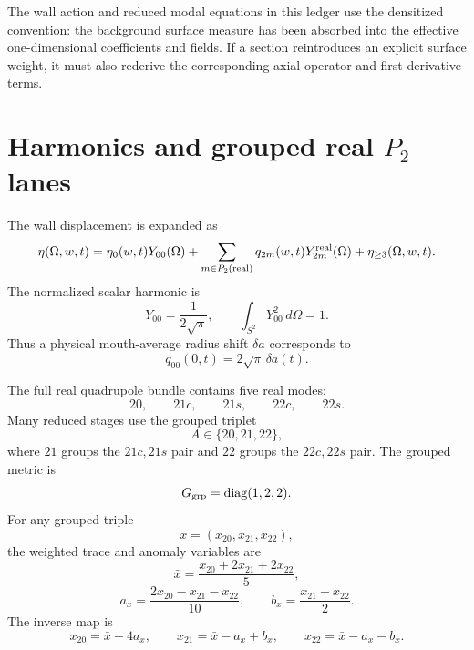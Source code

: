 The wall action and reduced modal equations in this ledger use the densitized convention: the background surface measure has been absorbed into the effective one-dimensional coefficients and fields.  If a section reintroduces an explicit surface weight, it must also rederive the corresponding axial operator and first-derivative terms.

\section{Harmonics and grouped real \texorpdfstring{\(P_2\)}{P2} lanes}
\label{sec:harmonic-p2-notation}

The wall displacement is expanded as
\begin{equation}
  \eta(\Omega,w,t)
  =
  \eta_0(w,t)Y_{00}(\Omega)
  +
  \sum_{m\in P_2({\rm real})}q_{2m}(w,t)Y_{2m}^{\rm real}(\Omega)
  +
  \eta_{\ge3}(\Omega,w,t).
\end{equation}
The normalized scalar harmonic is
\begin{equation}
  Y_{00}=\frac{1}{2\sqrt\pi},
  \qquad
  \int_{S^2}Y_{00}^2\,d\Omega=1.
\end{equation}
Thus a physical mouth-average radius shift \(\delta a\) corresponds to
\begin{equation}
  q_{00}(0,t)=2\sqrt\pi\,\delta a(t).
\end{equation}

The full real quadrupole bundle contains five real modes:
\begin{equation}
  20,
  \qquad
  21c,
  \qquad
  21s,
  \qquad
  22c,
  \qquad
  22s.
\end{equation}
Many reduced stages use the grouped triplet
\begin{equation}
  A\in\{20,21,22\},
\end{equation}
where \(21\) groups the \(21c,21s\) pair and \(22\) groups the \(22c,22s\) pair.  The grouped metric is
\begin{equation}
  G_{\rm grp}=\operatorname{diag}(1,2,2).
\end{equation}
For any grouped triple
\begin{equation}
  x=(x_{20},x_{21},x_{22}),
\end{equation}
the weighted trace and anomaly variables are
\begin{equation}
  \bar x=\frac{x_{20}+2x_{21}+2x_{22}}{5},
\end{equation}
\begin{equation}
  a_x=\frac{2x_{20}-x_{21}-x_{22}}{10},
  \qquad
  b_x=\frac{x_{21}-x_{22}}{2}.
\end{equation}
The inverse map is
\begin{equation}
  x_{20}=\bar x+4a_x,
  \qquad
  x_{21}=\bar x-a_x+b_x,
  \qquad
  x_{22}=\bar x-a_x-b_x.
\end{equation}


